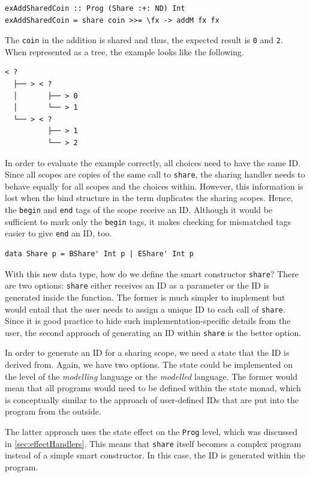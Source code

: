 \documentclass[a4paper, 11pt, fleqn, twoside]{scrreprt}
\newcommand{\hinl}[1]{\texttt{#1}}
\begin{document}
\begin{verbatim}
exAddSharedCoin :: Prog (Share :+: ND) Int
exAddSharedCoin = share coin >>= \fx -> addM fx fx
\end{verbatim}

The \hinl{coin} in the addition is shared and thus, the expected result is \hinl{0} and \hinl{2}.
When represented as a tree, the example looks like the following.

\begin{verbatim}
< ? 
  ├── > < ? 
  │       ├── > 0
  │       └── > 1
  └── > < ? 
          ├── > 1
          └── > 2
\end{verbatim}

In order to evaluate the example correctly, all choices need to have the same ID.
Since all scopes are copies of the same call to \hinl{share}, the sharing handler needs to behave equally for all scopes and the choices within.
However, this information is lost when the bind structure in the term duplicates the sharing scopes.
Hence, the \hinl{begin} and \hinl{end} tags of the scope receive an ID.
Although it would be sufficient to mark only the \hinl{begin} tags, it makes checking for mismatched tags easier to give \hinl{end} an ID, too.

\begin{verbatim}
data Share p = BShare' Int p | EShare' Int p
\end{verbatim}

With this new data type, how do we define the smart constructor \hinl{share}?
There are two options: \hinl{share} either receives an ID as a parameter or the ID is generated inside the function.
The former is much simpler to implement but would entail that the user needs to assign a unique ID to each call of \hinl{share}.
Since it is good practice to hide such implementation-specific details from the user, the second approach of generating an ID within \hinl{share} is the better option.

In order to generate an ID for a sharing scope, we need a state that the ID is derived from.
Again, we have two options.
The state could be implemented on the level of the \textit{modelling} language or the \textit{modelled} language.
The former would mean that all programs would need to be defined within the state monad, which is conceptually similar to the approach of user-defined IDs that are put into the program from the outside.

The latter approach uses the state effect on the \hinl{Prog} level, which was discussed in \autoref{sec:effectHandlers}.
This means that \hinl{share} itself becomes a complex program instead of a simple smart constructor.
In this case, the ID is generated within the program.
\end{document}

